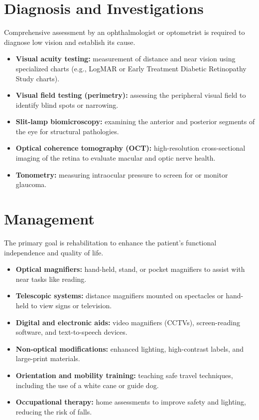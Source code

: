 \section*{Diagnosis and Investigations}
Comprehensive assessment by an ophthalmologist or optometrist is required to diagnose low vision and establish its cause.
\begin{itemize}
    \item \textbf{Visual acuity testing:} measurement of distance and near vision using specialized charts (e.g., LogMAR or Early Treatment Diabetic Retinopathy Study charts).
    \item \textbf{Visual field testing (perimetry):} assessing the peripheral visual field to identify blind spots or narrowing.
    \item \textbf{Slit-lamp biomicroscopy:} examining the anterior and posterior segments of the eye for structural pathologies.
    \item \textbf{Optical coherence tomography (OCT):} high-resolution cross-sectional imaging of the retina to evaluate macular and optic nerve health.
    \item \textbf{Tonometry:} measuring intraocular pressure to screen for or monitor glaucoma.
\end{itemize}

\section*{Management}
The primary goal is rehabilitation to enhance the patient's functional independence and quality of life.
\begin{itemize}
    \item \textbf{Optical magnifiers:} hand-held, stand, or pocket magnifiers to assist with near tasks like reading.
    \item \textbf{Telescopic systems:} distance magnifiers mounted on spectacles or hand-held to view signs or television.
    \item \textbf{Digital and electronic aids:} video magnifiers (CCTVs), screen-reading software, and text-to-speech devices.
    \item \textbf{Non-optical modifications:} enhanced lighting, high-contrast labels, and large-print materials.
    \item \textbf{Orientation and mobility training:} teaching safe travel techniques, including the use of a white cane or guide dog.
    \item \textbf{Occupational therapy:} home assessments to improve safety and lighting, reducing the risk of falls.
\end{itemize}

